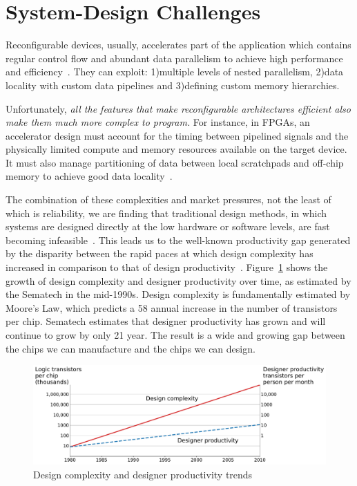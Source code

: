 \section{System-Design Challenges}


Reconfigurable devices, usually, accelerates part of the application which contains regular control flow and abundant data parallelism to achieve high performance and efficiency~\cite{spatial_computation, trips, govindaraju_hpca_2011}.
They can exploit: 1)multiple levels of nested parallelism, 2)data locality with custom data pipelines and 3)defining custom memory hierarchies.

Unfortunately, \textit{all the features that make reconfigurable architectures efficient also make them much more complex to program.}
For instance, in FPGAs, an accelerator design must account for the timing between pipelined signals and the physically limited compute and memory resources available on the target device.
It must also manage partitioning of data between local scratchpads and off-chip memory to achieve good data locality~\cite{gzip_2013_fpga}.


The combination of these complexities and market pressures, not the least
of which is reliability, we are finding that traditional design methods, in which
systems are designed directly at the low hardware or software levels, are fast
becoming infeasible~\cite{cascaval_taxonomy_accelerator}. This leads us to the well-known productivity gap generated by the disparity between the rapid paces at which design complexity has increased in comparison to that of design productivity~\cite{itrs}.
Figure~\ref{fig:productivity} shows the growth of design complexity and designer productivity
over time, as estimated by the Sematech in the mid-1990s. Design complexity
is fundamentally estimated by Moore’s Law, which predicts a 58%
annual increase in the number of transistors per chip. Sematech estimates that
designer productivity has grown and will continue to grow by only 21%
year. The result is a wide and growing gap between the chips we can manufacture
and the chips we can design. 

\begin{figure}[h]
    \centering
    \includegraphics[width=\textwidth]{plots/productivity.pdf}
    \caption{Design complexity and designer productivity trends}
    \label{fig:productivity}
\end{figure}

